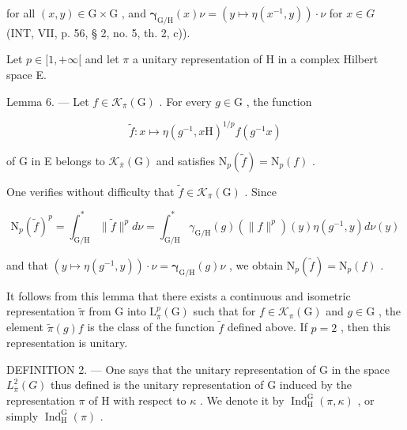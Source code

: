 for all \((x,y)\in\mathrm{G}\times\mathrm{G}\) , and \(\boldsymbol{\gamma}_{\mathrm{G}/\mathrm{H}}(x)\nu=(y\mapsto\eta(x^{-1},y))\cdot\nu\) for \(x\in G\) (INT, VII, p. 56, § 2, no. 5, th. 2, c)).

Let \(p \in [1, +\infty[\) and let \(\pi\) a unitary representation of H in a complex Hilbert space E.

Lemma 6. --- Let \(f \in \mathcal{K}_{\overline{\pi}}(\mathrm{G})\) . For every \(g \in \mathrm{G}\) , the function

\[
\widetilde {f} \colon x \mapsto \eta (g ^ {- 1}, x \mathrm{H}) ^ {1 / p} f (g ^ {- 1} x)
\]

of G in E belongs to \(\mathcal{K}_{\overline{\pi}}(\mathrm{G})\) and satisfies \(\mathrm{N}_p(\widetilde{f}) = \mathrm{N}_p(f)\) .

One verifies without difficulty that \(\tilde{f} \in \mathcal{K}_{\overline{\pi}}(\mathrm{G})\) . Since

\[
\mathrm{N} _ {p} (\widetilde {f}) ^ {p} = \int_ {\mathrm{G/H}} ^ {*} \| \widetilde {f} \| ^ {p} d \nu = \int_ {\mathrm{G/H}} ^ {*} \gamma_ {\mathrm{G/H}} (g) (\| f \| ^ {p}) (y) \eta (g ^ {- 1}, y) d \nu (y)
\]

 and that \((y\mapsto \eta (g^{-1},y))\cdot \nu = \pmb{\gamma}_{\mathrm{G / H}}(g)\nu\) , we obtain \(\mathrm{N}_p(\widetilde{f}) = \mathrm{N}_p(f)\) .

 It follows from this lemma that there exists a continuous and isometric representation \(\widetilde{\pi}\) from G into \(\mathrm{L}_{\overline{\pi}}^{p}(\mathrm{G})\) such that for \(f\in \mathcal{K}_{\pi}(\mathrm{G})\) and \(g\in \mathrm{G}\) , the element \(\widetilde{\pi}(g)f\) is the class of the function \(\widetilde{f}\) defined above. If \(p=2\) , then this representation is unitary.

DEFINITION 2. --- One says that the unitary representation of G in the space \(L_{\overline{\pi}}^{2}(G)\) thus defined is the unitary representation of G induced by the representation \(\pi\) of H with respect to \(\kappa\) . We denote it by \(\operatorname{Ind}_{\mathrm{H}}^{\mathrm{G}}(\pi, \kappa)\) , or simply \(\operatorname{Ind}_{\mathrm{H}}^{\mathrm{G}}(\pi)\) .

